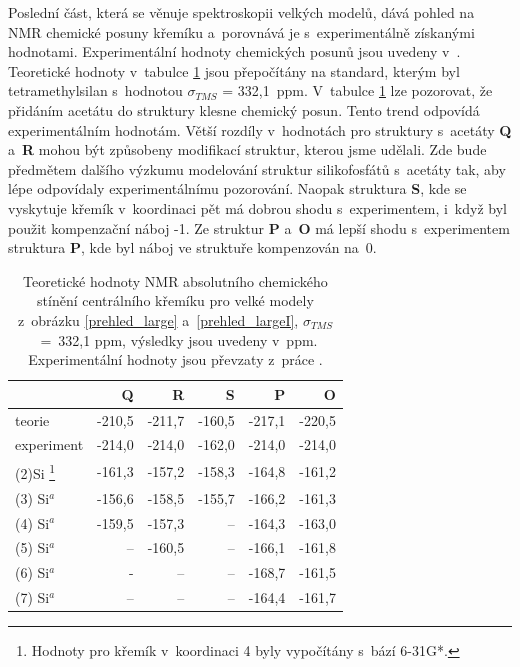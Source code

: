 \documentclass[
digital, %
table,   %
nolof,     %
nolot,     %
oneside,
]{fithesis3}
\begin{document}
Poslední část, která se věnuje spektroskopii velkých modelů, dává pohled na NMR chemické posuny křemíku a~porovnává je s~experimentálně získanými hodnotami. Experimentální hodnoty chemických posunů jsou uvedeny v~\cite{rtg_4_pinkas}. Teoretické hodnoty v~tabulce \ref{nmr} jsou přepočítány na standard, kterým byl tetramethylsilan s~hodnotou $\sigma_{TMS}$ = 332,1~ppm. V~tabulce \ref{nmr} lze pozorovat, že přidáním acetátu do struktury klesne chemický posun. Tento trend odpovídá experimentálním hodnotám. Větší rozdíly v~hodnotách pro struktury s~acetáty  \textbf{Q} a~\textbf{R} mohou být způsobeny modifikací struktur, kterou jsme udělali. Zde bude předmětem dalšího výzkumu modelování struktur silikofosfátů s~acetáty tak, aby lépe odpovídaly experimentálnímu pozorování. Naopak struktura  \textbf{S}, kde se vyskytuje křemík v~koordinaci pět má dobrou shodu s~experimentem, i~když byl použit kompenzační náboj -1. Ze struktur \textbf{P} a~\textbf{O} má lepší shodu s~experimentem struktura \textbf{P}, kde byl náboj ve struktuře kompenzován na~0.

\begin{table}[H]
\begin{minipage}{\textwidth}
\caption{Teoretické hodnoty NMR absolutního chemického stínění centrálního křemíku pro velké modely z~obrázku \ref{prehled_large} a~\ref{prehled_largeI}, $\sigma_{TMS}$~=~332,1 ppm, výsledky jsou uvedeny v~ppm. Experimentální hodnoty jsou převzaty z~práce \cite{rtg_4_pinkas}.}
\begin{center}
\begin{tabular}{|l|r|r|r|r|r|}
\hline
\label{nmr} & \textbf{Q} & \textbf{R} &\textbf{S} & \textbf{P} & \textbf{O}  \\ \hline
teorie & -210,5 & -211,7 & \multicolumn{1}{r|}{-160,5} & -217,1 & -220,5 \\ \hline
experiment & -214,0 & -214,0 & -162,0 & -214,0 & -214,0 \\ \hline \hline
(2)Si \footnote{Hodnoty pro křemík v~koordinaci 4 byly vypočítány s~bází 6-31G*.} & -161,3 & -157,2 & -158,3& -164,8 & -161,2 \\ \hline
(3) Si$^a$ & -156,6 & -158,5 & -155,7 & -166,2 & -161,3 \\ \hline
(4) Si$^a$ & -159,5 & -157,3 & -- & -164,3 & -163,0 \\ \hline
(5) Si$^a$ & -- & -160,5 & -- & -166,1 & -161,8 \\ \hline
(6) Si$^a$ &- & -- & -- & -168,7 & -161,5 \\ \hline
(7) Si$^a$ & -- & -- & -- & -164,4 & -161,7 \\ \hline
\end{tabular}\end{center}\end{minipage}\end{table}
\end{document}
